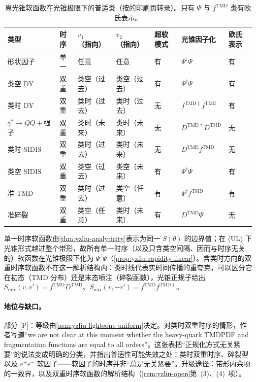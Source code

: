 \begin{table}[htbp]
\centering
\footnotesize
\renewcommand{\arraystretch}{1.08}
\begin{tabular}{@{}lllllll@{}}
\toprule
类型 & 时序 & $v_1$（指向） & $v_2$（指向） & 超软模式 & 光锥因子化 & 欧氏表示 \\
\midrule
形状因子 & 单一 & 任意 & 任意 & 有 & $\Psi^\dagger\Psi$ & 有 \\
类空 DY & 双重 & 类空（过去） & 类空（过去） & 有 & $\Psi^\dagger\Psi$ & 有 \\
类时 DY & 双重 & 类时（过去） & 类时（过去） & 无 & $f^{\mathrm{TMD}\dagger}f^{\mathrm{TMD}}$ & 有 \\
$\gamma^*\to\bar QQ+$强子 & 双重 & 类时（未来） & 类时（未来） & 无 & $D^{\mathrm{TMD}\dagger}D^{\mathrm{TMD}}$ & 无 \\
类时 SIDIS & 双重 & 类时（过去） & 类时（未来） & 无 & $D^{\mathrm{TMD}}f^{\mathrm{TMD}}$ & 无 \\
类空 SIDIS & 双重 & 类空（过去） & 类空（未来） & 有 & $\Psi^\dagger\Psi$ & 有 \\
准 TMD & 双重 & 类时（过去） & 类空（任意） & 有 & $\Psi^\dagger f^{\mathrm{TMD}}$ & 有 \\
准碎裂 & 双重 & 类空（任意） & 类时（未来） & 有 & $D^{\mathrm{TMD}}\Psi$ & 无 \\
\bottomrule
\end{tabular}
\caption{离光锥软函数在光锥极限下的普适类（按\cite[表~2]{Liu:2022nnk}的印刷页转录）。只有 $\Psi$ 与 $f^{\mathrm{TMD}}$ 类有欧氏表示。}
\label{tab:yzliu-classes}
\end{table}

\begin{proofsketch}
单一时序软函数由\cref{thm:yzliu-analyticity}表示为同一 $S(\theta)$ 的边界值；在 (UL) 下光锥形式越过整个带形，故所有单一时序（以及只含类空间隔、因而与时序无关的）软函数在光锥极限下化为 $\Psi^\dagger\Psi$（\cref{prop:yzliu-rapidity-linear}）。含类时方向的双重时序软函数不在这一解析结构内：类时线代表实时间传播的重夸克，可以区分它在初态（TMD 分布）还是末态喷注（碎裂函数），光锥正规子给出 $S_{\mathrm{mix}}(v,v')=f^{\mathrm{TMD}}D^{\mathrm{TMD}}$、$S_{\mathrm{mix}}(v,-v')=f^{\mathrm{TMD}}f^{\mathrm{TMD}\dagger}$\cite[第~4.6--4.7~节，式~(139)--(142)]{Liu:2022nnk}。
\end{proofsketch}

\paragraph{地位与缺口。}部分 [P]：等级由\cref{asm:yzliu-lightcone-uniform}决定。对类时双重时序的情形，作者写道“we are not clear at this moment whether the heavy-quark TMDPDF and fragmentation functions are equal to all orders”\cite[第~6~节]{Liu:2022nnk}。这张表把“正规化方式无关紧要”的说法变成明确的分类，并指出普适性可能失效之处：类时双重时序、碎裂型以及 $e^+e^-$ 软因子——软因子的时序并非“总是无关紧要”。升级途径：带形内余项的一致界，以及双重时序软函数的解析结构（\cref{rem:yzliu-open}第~(3)、(4)~项）。

